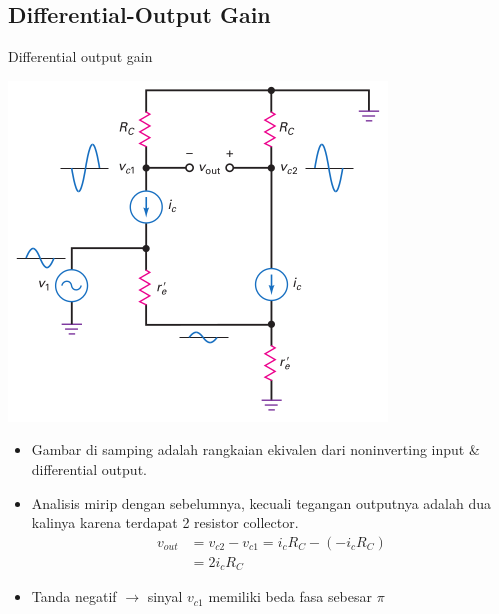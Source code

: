 \documentclass[aspectratio=169]{beamer}
\begin{document}
\subsection{Differential-Output Gain}
\begin{frame}{Differential output gain}
	\begin{multicols}{2}
		\begin{center}
			\includegraphics[height=0.7\textheight]{gambar/01.noninverting_input_and_differential_output}
		\end{center}
		\columnbreak
		\begin{itemize}
			\item Gambar di samping adalah rangkaian ekivalen dari noninverting input \& differential output.
			\item Analisis mirip dengan sebelumnya, kecuali tegangan outputnya adalah dua kalinya karena terdapat 2 resistor collector.
			\begin{align*}
				v_{out} &= v_{c2} - v_{c1} = i_c R_C - (-i_c R_C) \\
				&= 2 i_c R_C
			\end{align*}
			\item Tanda negatif $ \rightarrow $ sinyal $ v_{c1} $ memiliki beda fasa sebesar $ \pi $
		\end{itemize}
	\end{multicols}
\end{frame}
\end{document}
